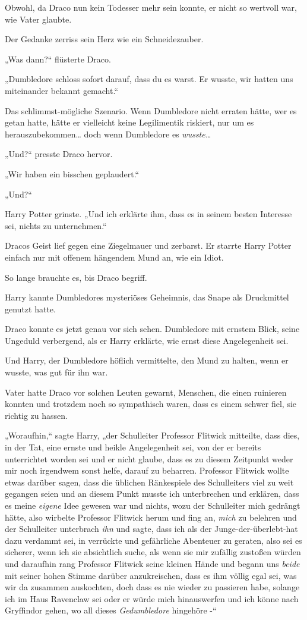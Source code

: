{Obwohl, da Draco nun kein Todesser mehr sein konnte, er nicht so wertvoll war, wie Vater glaubte.

Der Gedanke zerriss sein Herz wie ein Schneidezauber.

„Was dann?“ flüsterte Draco.

„Dumbledore schloss sofort darauf, dass du es warst. Er wusste, wir hatten uns miteinander bekannt gemacht.“

Das schlimmst-mögliche Szenario. Wenn Dumbledore nicht erraten hätte, wer es getan hatte, hätte er vielleicht keine Legilimentik riskiert, nur um es herauszubekommen… doch wenn Dumbledore es \emph{wusste…}

„Und?“ presste Draco hervor.

„Wir haben ein bisschen geplaudert.“

„Und?“

Harry Potter grinste. „Und ich erklärte ihm, dass es in seinem besten Interesse sei, nichts zu unternehmen.“

Dracos Geist lief gegen eine Ziegelmauer und zerbarst. Er starrte Harry Potter einfach nur mit offenem hängendem Mund an, wie ein Idiot.

So lange brauchte es, bis Draco begriff.

Harry kannte Dumbledores mysteriöses Geheimnis, das Snape als Druckmittel genutzt hatte.

Draco konnte es jetzt genau vor sich sehen. Dumbledore mit ernstem Blick, seine Ungeduld verbergend, als er Harry erklärte, wie ernst diese Angelegenheit sei.

Und Harry, der Dumbledore höflich vermittelte, den Mund zu halten, wenn er wusste, was gut für ihn war.

Vater hatte Draco vor solchen Leuten gewarnt, Menschen, die einen ruinieren konnten und trotzdem noch so sympathisch waren, dass es einem schwer fiel, sie richtig zu hassen.

„Woraufhin,“ sagte Harry, „der Schulleiter Professor Flitwick mitteilte, dass dies, in der Tat, eine ernste und heikle Angelegenheit sei, von der er bereits unterrichtet worden sei und er nicht glaube, dass es zu diesem Zeitpunkt weder mir noch irgendwem sonst helfe, darauf zu beharren. Professor Flitwick wollte etwas darüber sagen, dass die üblichen Ränkespiele des Schulleiters viel zu weit gegangen seien und an diesem Punkt musste ich unterbrechen und erklären, dass es meine \emph{eigene} Idee gewesen war und nichts, wozu der Schulleiter mich gedrängt hätte, also wirbelte Professor Flitwick herum und fing an, \emph{mich} zu belehren und der Schulleiter unterbrach \emph{ihn} und sagte, dass ich als der Junge-der-überlebt-hat dazu verdammt sei, in verrückte und gefährliche Abenteuer zu geraten, also sei es sicherer, wenn ich sie absichtlich suche, als wenn sie mir zufällig zustoßen würden und daraufhin rang Professor Flitwick seine kleinen Hände und begann uns \emph{beide} mit seiner hohen Stimme darüber anzukreischen, dass es ihm völlig egal sei, was wir da zusammen auskochten, doch dass es nie wieder zu passieren habe, solange ich im Haus Ravenclaw sei oder er würde mich hinauswerfen und ich könne nach Gryffindor gehen, wo all dieses \emph{Gedumbledore} hingehöre -“

}
